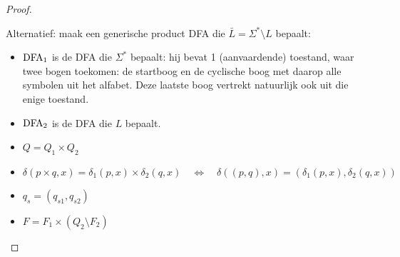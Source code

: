 \documentclass[../aanvullingen_cursus.tex]{subfiles}
\begin{document}
\begin{proof}
\begin{itemize}
		Alternatief: maak een generische product DFA die \(\bar{L}=\Sigma^*\setminus L \) bepaalt:
		\begin{itemize}
			\item \(\text{DFA}_1\) is de DFA die \(\Sigma^*\) bepaalt: hij bevat 1 (aanvaardende) toestand, waar twee bogen toekomen: de startboog en de cyclische boog met daarop alle symbolen uit het alfabet. Deze laatste boog vertrekt natuurlijk ook uit die enige toestand.
			\item \(\text{DFA}_2\) is de DFA die \(L\) bepaalt.
			\item \(Q=Q_1 \times Q_2\)
			\item \(\delta(p \times q, x)=\delta_1(p,x) \times \delta_2(q,x) \quad \Leftrightarrow \quad
			\delta\left((p,q), x\right)=\left(\delta_1(p,x), \delta_2(q,x)\right)\)
			\item \(q_s = (q_{s1},q_{s2})\)
			\item \(F = F_1 \times (Q_2 \setminus F_2)\)
		\end{itemize}
	\end{itemize}
\end{proof}
\end{document}

